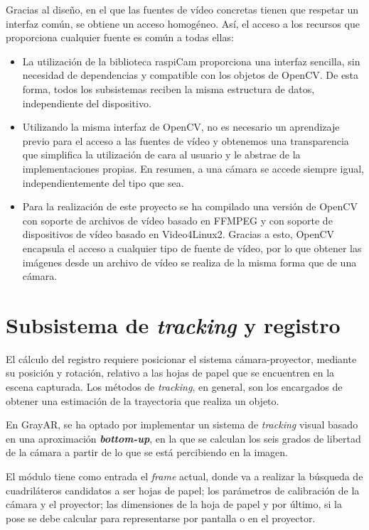 Gracias al diseño, en el que las fuentes de vídeo concretas tienen que respetar un interfaz común, se obtiene un acceso homogéneo. Así, el acceso a los recursos que proporciona cualquier fuente es común a todas ellas:
\begin{itemize}
\item La utilización de la biblioteca raspiCam proporciona una interfaz sencilla, sin necesidad de dependencias y compatible con los objetos de OpenCV. De esta forma, todos los subsistemas reciben la misma estructura de datos, independiente del dispositivo.

\item Utilizando la misma interfaz de OpenCV, no es necesario un aprendizaje previo para el acceso a las fuentes de vídeo y obtenemos una transparencia que simplifica la utilización de cara al usuario y le abstrae de la implementaciones propias. En resumen, a una cámara se accede siempre igual, independientemente del tipo que sea.

\item Para la realización de este proyecto se ha compilado una versión de OpenCV con soporte de archivos de vídeo basado en FFMPEG y con soporte de dispositivos de vídeo basado en Video4Linux2. Gracias a esto, OpenCV encapsula el acceso a cualquier tipo de fuente de vídeo, por lo que obtener las imágenes desde un archivo de vídeo se realiza de la misma forma que de una cámara.
\end{itemize}

\section{Subsistema de \textit{tracking} y registro}
El cálculo del registro requiere posicionar el sistema cámara-proyector, mediante su posición y rotación, relativo a las hojas de papel que se encuentren en la escena capturada. Los métodos de \textit{tracking}, en general, son los encargados de obtener una estimación de la trayectoria que realiza un
objeto. 

En GrayAR, se ha optado por implementar un sistema de \textit{tracking} visual basado en una aproximación \textbf{\textit{bottom-up}}\cite{Marimon}, en la que se calculan los seis grados de libertad de la cámara a partir de lo que se está percibiendo en la imagen.

El módulo tiene como entrada el \textit{frame} actual, donde va a realizar la búsqueda de cuadriláteros candidatos a ser hojas de papel; los parámetros de calibración de la cámara y el proyector; las dimensiones de la hoja de papel y por último, si la pose se debe calcular para representarse por pantalla o en el proyector.


